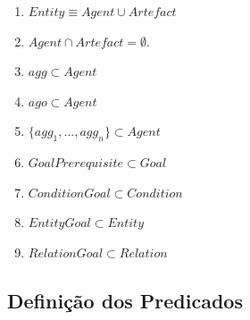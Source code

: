 \documentclass[12pt]{article}
\begin{document}
\begin{enumerate}
	\item $Entity \equiv Agent \cup Artefact$
	\item $Agent \cap Artefact = \emptyset $.
	\item $ agg \subset Agent$
	\item $ ago \subset Agent$ 
	\item $\{agg_1,...,agg_n\} \subset Agent$	
	\item $ GoalPrerequisite \subset Goal$
	\item $ ConditionGoal \subset Condition$
	\item $ EntityGoal \subset Entity$		
	\item $ RelationGoal \subset Relation$
\end{enumerate}

\subsection{Definição dos Predicados}
\end{document}
